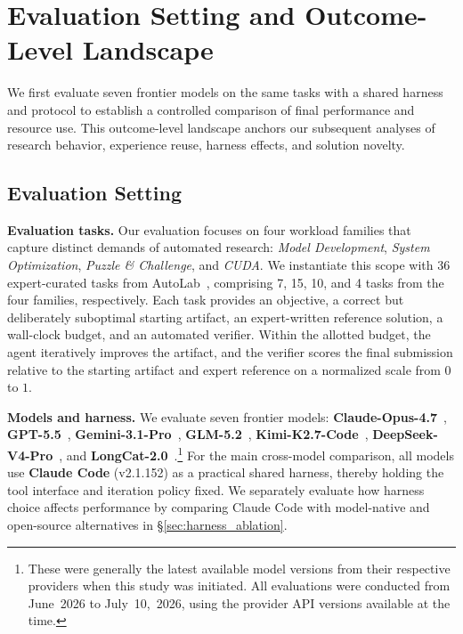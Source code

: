 \section{Evaluation Setting and Outcome-Level Landscape}
\label{sec:main_exp}

We first evaluate seven frontier models on the same tasks with a shared harness and protocol to establish a controlled comparison of final performance and resource use.
This outcome-level landscape anchors our subsequent analyses of research behavior, experience reuse, harness effects, and solution novelty.

\subsection{Evaluation Setting}
\label{sec:setup}

\textbf{Evaluation tasks.}
Our evaluation focuses on four workload families that capture distinct demands of automated research: \textit{Model Development}, \textit{System Optimization}, \textit{Puzzle \& Challenge}, and \textit{CUDA}.
We instantiate this scope with 36 expert-curated tasks from AutoLab~\citep{xu2026autolab}, comprising 7, 15, 10, and 4 tasks from the four families, respectively.
Each task provides an objective, a correct but deliberately suboptimal starting artifact, an expert-written reference solution, a wall-clock budget, and an automated verifier.
Within the allotted budget, the agent iteratively improves the artifact, and the verifier scores the final submission relative to the starting artifact and expert reference on a normalized scale from $0$ to $1$.

\textbf{Models and harness.}
We evaluate seven frontier models: \textbf{Claude-Opus-4.7}~\citep{anthropic2026opus47}, \textbf{GPT-5.5}~\citep{openai2026gpt55}, \textbf{Gemini-3.1-Pro}~\citep{google2026gemini31pro}, \textbf{GLM-5.2}~\citep{zai2026glm5.2}, \textbf{Kimi-K2.7-Code}~\citep{moonshot2026kimik27code}, \textbf{DeepSeek-V4-Pro}~\citep{deepseek2026deepseekv4}, and \textbf{LongCat-2.0}~\citep{longcat2026longcat2}.\footnote{These were generally the latest available model versions from their respective providers when this study was initiated. All evaluations were conducted from June~2026 to July~10,~2026, using the provider API versions available at the time.}
For the main cross-model comparison, all models use \textbf{Claude Code} (v2.1.152) as a practical shared harness, thereby holding the tool interface and iteration policy fixed.
We separately evaluate how harness choice affects performance by comparing Claude Code with model-native and open-source alternatives in \S\ref{sec:harness_ablation}.


